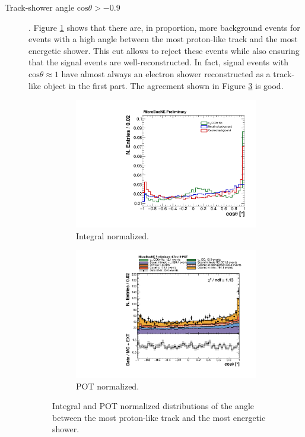 \begin{description}
\item[Track-shower angle $\mathrm{cos}\theta > -0.9$]. Figure \ref{fig:angle_integral} shows that there are, in proportion, more background events for events with a high angle between the most proton-like track and the most energetic shower. This cut allows to reject these events while also ensuring that the signal events are well-reconstructed. In fact, signal events with $\mathrm{cos}\theta \approx 1$ have almost always an electron shower reconstructed as a track-like object in the first part. The agreement shown in Figure \ref{fig:angle_pot} is good.

\begin{figure}[htbp]
\centering
  \begin{subfigure}{0.45\textwidth}
    \includegraphics[width=\linewidth]{figures/h_track_shower_angle_norm.pdf}
    \caption{Integral normalized.} \label{fig:angle_integral}
  \end{subfigure}
    \begin{subfigure}{0.45\textwidth}
    \includegraphics[width=\linewidth]{figures/h_track_shower_angle.pdf}
    \caption{POT normalized.} \label{fig:angle_pot}
  \end{subfigure}
  \caption{Integral and POT normalized distributions of the angle between the most proton-like track and the most energetic shower.}
\end{figure}


\end{description}
